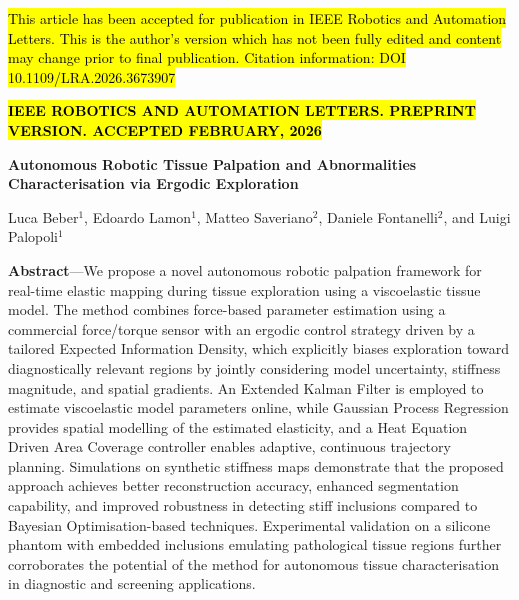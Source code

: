 \documentclass[11pt]{article}
\begin{document}
\begin{center}
\footnotesize
{}\hl{This article has been accepted for publication in IEEE Robotics and
Automation Letters. This is the author's version which has not been
fully edited and content may change prior to final publication.
Citation information: DOI 10.1109/LRA.2026.3673907}

\vspace{0.3em}
\textbf{\hl{IEEE ROBOTICS AND AUTOMATION LETTERS. PREPRINT VERSION.
ACCEPTED FEBRUARY, 2026}}
\end{center}

\vspace{1em}

\begin{center}
{\Large\bfseries Autonomous Robotic Tissue Palpation and Abnormalities
Characterisation via Ergodic Exploration}

\vspace{0.8em}

{\normalsize Luca Beber$^{1}$, Edoardo Lamon$^{1}$,
Matteo Saveriano$^{2}$, Daniele Fontanelli$^{2}$, and
Luigi Palopoli$^{1}$}
\end{center}

\vspace{0.8em}

\noindent\textbf{Abstract}---We propose a novel autonomous robotic
palpation framework for real-time elastic mapping during tissue
exploration using a viscoelastic tissue model. The method combines
force-based parameter estimation using a commercial force/torque
sensor with an ergodic control strategy driven by a tailored Expected
Information Density, which explicitly biases exploration toward
diagnostically relevant regions by jointly considering model
uncertainty, stiffness magnitude, and spatial gradients. An Extended
Kalman Filter is employed to estimate viscoelastic model parameters
online, while Gaussian Process Regression provides spatial modelling
of the estimated elasticity, and a Heat Equation Driven Area Coverage
controller enables adaptive, continuous trajectory planning.
Simulations on synthetic stiffness maps demonstrate that the proposed
approach achieves better reconstruction accuracy, enhanced
segmentation capability, and improved robustness in detecting stiff
inclusions compared to Bayesian Optimisation-based techniques.
Experimental validation on a silicone phantom with embedded inclusions
emulating pathological tissue regions further corroborates the
potential of the method for autonomous tissue characterisation in
diagnostic and screening applications.
\end{document}
